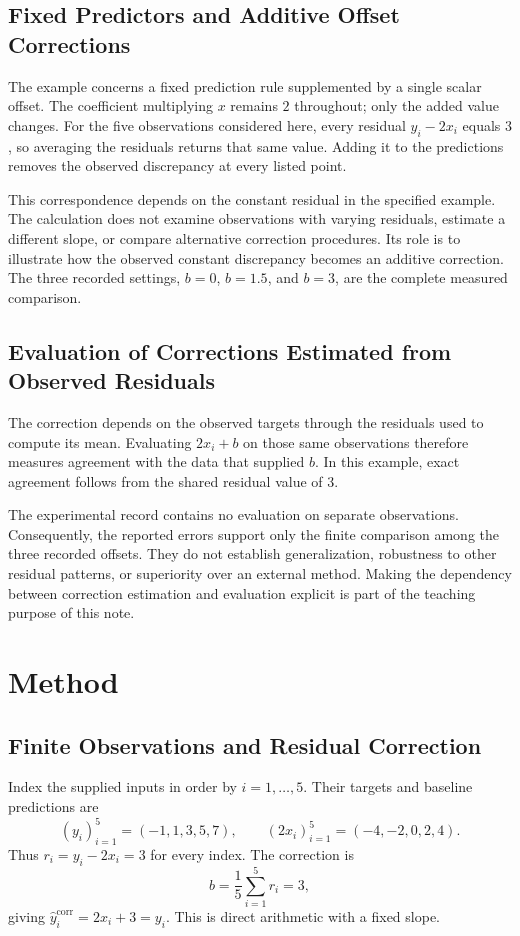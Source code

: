 \documentclass[11pt]{article}
\begin{document}
\subsection{Fixed Predictors and Additive Offset Corrections}
The example concerns a fixed prediction rule supplemented by a single scalar offset. The coefficient multiplying $x$ remains $2$ throughout; only the added value changes. For the five observations considered here, every residual $y_i-2x_i$ equals $3$, so averaging the residuals returns that same value. Adding it to the predictions removes the observed discrepancy at every listed point.

This correspondence depends on the constant residual in the specified example. The calculation does not examine observations with varying residuals, estimate a different slope, or compare alternative correction procedures. Its role is to illustrate how the observed constant discrepancy becomes an additive correction. The three recorded settings, $b=0$, $b=1.5$, and $b=3$, are the complete measured comparison.

\subsection{Evaluation of Corrections Estimated from Observed Residuals}
The correction depends on the observed targets through the residuals used to compute its mean. Evaluating $2x_i+b$ on those same observations therefore measures agreement with the data that supplied $b$. In this example, exact agreement follows from the shared residual value of $3$.

The experimental record contains no evaluation on separate observations. Consequently, the reported errors support only the finite comparison among the three recorded offsets. They do not establish generalization, robustness to other residual patterns, or superiority over an external method. Making the dependency between correction estimation and evaluation explicit is part of the teaching purpose of this note.
\section{Method}
\subsection{Finite Observations and Residual Correction}
Index the supplied inputs in order by $i=1,\ldots,5$. Their targets and baseline predictions are
\[
(y_i)_{i=1}^{5}=(-1,1,3,5,7),
\qquad
(2x_i)_{i=1}^{5}=(-4,-2,0,2,4).
\]
Thus $r_i=y_i-2x_i=3$ for every index. The correction is
\[
b=\frac{1}{5}\sum_{i=1}^{5}r_i=3,
\]
giving $\hat{y}_i^{\mathrm{corr}}=2x_i+3=y_i$. This is direct arithmetic with a fixed slope.
\end{document}
